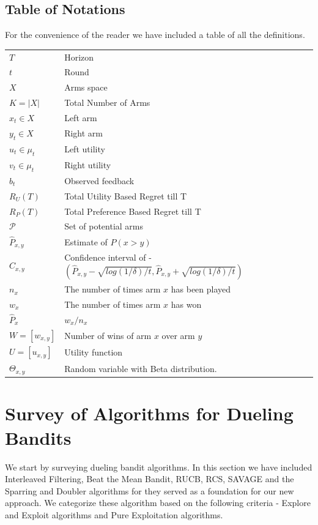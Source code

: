 \documentclass{llncs}
\begin{document}
\subsection{Table of Notations}
For the convenience of the reader we have included a table of all the definitions. 
	\begin{table}[h]
		\begin{tabular}{ll}
 			$T$ & Horizon \\
 			$t$ &  Round \\
 			$X$ & Arms space \\
 			$K = |X|$ & Total Number of Arms\\
 			$x_t \in X$ & Left arm \\
 			$y_t \in X$ & Right arm \\
 			$u_t \in \mu_t$ & Left utility \\
 			$v_t \in \mu_t$ & Right utility \\
 			$b_t$ & Observed feedback \\
 			$R_U(T)$ & Total Utility Based Regret till T\\
			$R_P(T)$ & Total Preference Based Regret till T\\
 			$\mathcal{P}$ & Set of potential arms \\
 			$\hat{P}_{x, y}$ & Estimate of $P(x>y)$\\
 			$\hat{C}_{x, y}$ &   Confidence interval of - $(\hat{P}_{x, y} - \sqrt{log(1/\delta)/t},\hat{P}_{x, y} +\sqrt{log(1/\delta)/t})$\\
 			$n_x$ &   The number of times arm $x$ has been played\\
 			$w_x$ & The number of times arm $x$ has won\\
 			$\hat{P}_x  $ &  $ w_x / n_x $\\
 			$ W = [w_{x,y}]$ & Number of wins of arm $x$ over arm $y$\\
 			$U = [u_{x,y}]$ &  Utility function\\
 			$\Theta_{x,y}$ &   Random variable with Beta distribution.
		\end{tabular}
	\end{table}

\section{Survey of Algorithms for Dueling Bandits}
	We start by surveying dueling bandit algorithms. In this section we have included Interleaved Filtering, Beat the Mean Bandit, RUCB, RCS, SAVAGE and the Sparring and Doubler algorithms for they served as a foundation for our new approach. We categorize these algorithm based on the following criteria - Explore and Exploit algorithms and Pure Exploitation algorithms.
\end{document}
